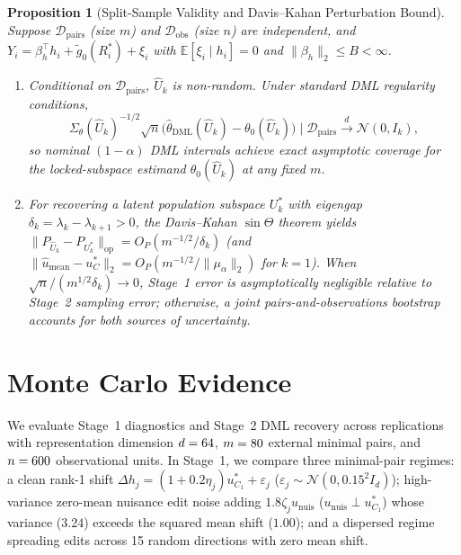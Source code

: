 \documentclass[11pt]{article}
\newtheorem{proposition}{Proposition}
\begin{document}
\begin{proposition}[Split-Sample Validity and Davis--Kahan Perturbation Bound]\label{prop:inference}
Suppose $\mathcal{D}_{\mathrm{pairs}}$ (size $m$) and $\mathcal{D}_{\mathrm{obs}}$ (size $n$) are independent, and $Y_i = \beta_h^\top h_i + \tilde{g}_0(R_i^*) + \xi_i$ with $\mathbb{E}[\xi_i \mid h_i] = 0$ and $\|\beta_h\|_2 \le B < \infty$.
\begin{enumerate}
    \item[(a)] Conditional on $\mathcal{D}_{\mathrm{pairs}}$, $\hat{U}_k$ is non-random. Under standard DML regularity conditions,
    \[
    \Sigma_\theta(\hat{U}_k)^{-1/2}\sqrt{n}\big(\hat{\theta}_{\mathrm{DML}}(\hat{U}_k) - \theta_0(\hat{U}_k)\big) \;\Big|\; \mathcal{D}_{\mathrm{pairs}} \xrightarrow{d} \mathcal{N}(0, I_k),
    \]
    so nominal $(1-\alpha)$ DML intervals achieve exact asymptotic coverage for the locked-subspace estimand $\theta_0(\hat{U}_k)$ at any fixed $m$.
    \item[(b)] For recovering a latent population subspace $U_k^*$ with eigengap $\delta_k = \lambda_k - \lambda_{k+1} > 0$, the Davis--Kahan $\sin\Theta$ theorem \citep{davis1970rotation} yields $\|P_{\hat{U}_k} - P_{U_k^*}\|_{\mathrm{op}} = O_P(m^{-1/2}/\delta_k)$ (and $\|\hat{u}_{\mathrm{mean}} - u_C^*\|_2 = O_P(m^{-1/2}/\|\mu_\alpha\|_2)$ for $k=1$). When $\sqrt{n}/(m^{1/2}\delta_k) \to 0$, Stage~1 error is asymptotically negligible relative to Stage~2 sampling error; otherwise, a joint pairs-and-observations bootstrap accounts for both sources of uncertainty.
\end{enumerate}
\end{proposition}

\section{Monte Carlo Evidence}

We evaluate Stage~1 diagnostics and Stage~2 DML recovery across \simNReps{} replications with representation dimension $d = 64$, $m = 80$ external minimal pairs, and $n = 600$ observational units. In Stage~1, we compare three minimal-pair regimes: a clean rank-1 shift $\Delta h_j = (1 + 0.2\eta_j)u_{C_1}^* + \varepsilon_j$ ($\varepsilon_j \sim \mathcal{N}(0, 0.15^2 I_d)$); high-variance zero-mean nuisance edit noise adding $1.8\zeta_j u_{\mathrm{nuis}}$ ($u_{\mathrm{nuis}} \perp u_{C_1}^*$) whose variance ($3.24$) exceeds the squared mean shift ($1.00$); and a dispersed regime spreading edits across 15 random directions with zero mean shift.
\end{document}
